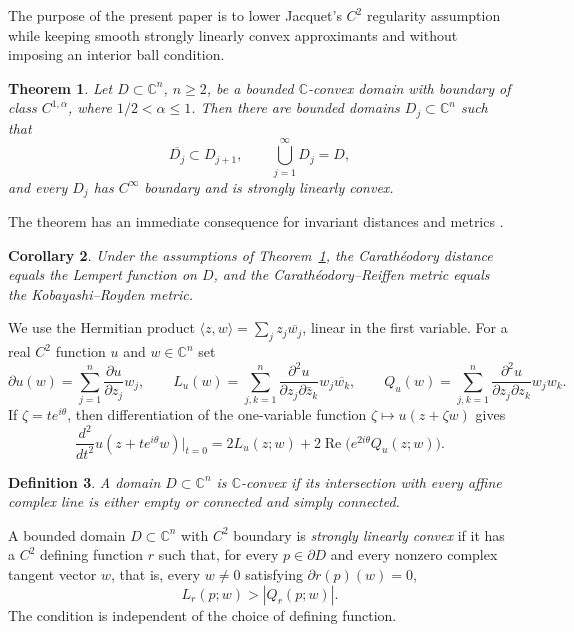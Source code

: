 \documentclass[12pt]{amsart}
\newtheorem{theorem}{Theorem}[section]
\newtheorem{corollary}[theorem]{Corollary}
\newtheorem{definition}[theorem]{Definition}
\newcommand{\C}{\mathbb C}
\begin{document}
The purpose of the present paper is to lower Jacquet's $C^2$ regularity assumption while keeping smooth strongly linearly convex approximants and without imposing an interior ball condition.

\begin{theorem}\label{thm:main}
Let $D\subset\C^n$, $n\ge2$, be a bounded $\C$-convex domain with boundary of class $C^{1,\alpha}$, where $1/2<\alpha\le1$. Then there are bounded domains $D_j\subset\C^n$ such that
\[
 \overline{D_j}\subset D_{j+1},\qquad \bigcup_{j=1}^\infty D_j=D,
\]
and every $D_j$ has $C^\infty$ boundary and is strongly linearly convex.
\end{theorem}

The theorem has an immediate consequence for invariant distances and metrics \cite{JP,KW,Lem81,Lem84}. 

\begin{corollary}\label{cor:lempert}
Under the assumptions of Theorem~\ref{thm:main}, the Carath\'eodory distance equals the Lempert function on $D$, and the Carath\'eodory--Reiffen metric equals the Kobayashi--Royden metric.
\end{corollary}

We use the Hermitian product $\langle z,w\rangle=\sum_j z_j\overline{w_j}$, linear in the first variable. For a real $C^2$ function $u$ and $w\in\C^n$ set
\[
 \partial u(w)=\sum_{j=1}^n \frac{\partial u}{\partial z_j}w_j,
 \qquad
 L_u(w)=\sum_{j,k=1}^n \frac{\partial^2 u}{\partial z_j\partial\bar z_k}w_j\overline{w_k},
 \qquad
 Q_u(w)=\sum_{j,k=1}^n \frac{\partial^2u}{\partial{z_j}\partial z_k}w_jw_k.
\]
If $\zeta=t e^{i\theta}$, then differentiation of the one-variable function $\zeta\mapsto u(z+\zeta w)$ gives
\begin{equation}\label{eq:complex-line-second}
 \frac{d^2}{dt^2}u(z+t e^{i\theta}w)\bigg|_{t=0}
 =2L_u(z;w)+2\operatorname{Re}\bigl(e^{2i\theta}Q_u(z;w)\bigr).
\end{equation}
\begin{definition}
A domain $D\subset\C^n$ is $\C$-convex if its intersection with every affine complex line is either empty or connected and simply connected.
\end{definition}

A bounded domain $D\subset\C^n$ with $C^2$ boundary is \emph{strongly linearly convex} if it has a $C^2$ defining function $r$ such that, for every $p\in\partial D$ and every nonzero complex tangent vector $w$, that is, every $w\ne0$ satisfying $\partial r(p)(w)=0$,
\begin{equation}\label{eq:slc}
 L_r(p;w)>|Q_r(p;w)|.
\end{equation}
The condition is independent of the choice of defining function.
\end{document}
